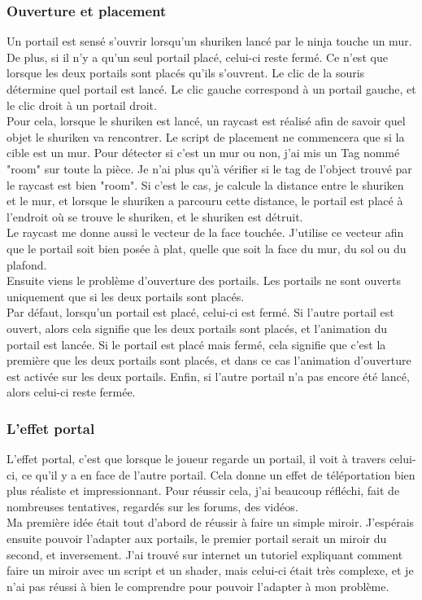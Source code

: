 \documentclass[12pt]{article}
\begin{document}
\subsubsection{Ouverture et placement}

Un portail est sensé s'ouvrir lorsqu'un shuriken lancé par le ninja touche un mur. De plus, si il n'y a qu'un seul portail placé, celui-ci reste fermé. Ce n'est que lorsque les deux portails sont placés qu'ils s'ouvrent. Le clic de la souris détermine quel portail est lancé. Le clic gauche correspond à un portail gauche, et le clic droit à un portail droit.\\

Pour cela, lorsque le shuriken est lancé, un raycast est réalisé afin de savoir quel objet le shuriken va rencontrer. Le script de placement ne commencera que si la cible est un mur. Pour détecter si c'est un mur ou non, j'ai mis un Tag nommé "room" sur toute la pièce. Je n'ai plus qu'à vérifier si le tag de l'object trouvé par le raycast est bien "room". Si c'est le cas, je calcule la distance entre le shuriken et le mur, et lorsque le shuriken a parcouru cette distance, le portail est placé à l'endroit où se trouve le shuriken, et le shuriken est détruit.\\
Le raycast me donne aussi le vecteur de la face touchée. J'utilise ce vecteur afin que le portail soit bien posée à plat, quelle que soit la face du mur, du sol ou du plafond.\\

Ensuite viens le problème d'ouverture des portails. Les portails ne sont ouverts uniquement que si les deux portails sont placés.\\
Par défaut, lorsqu'un portail est placé, celui-ci est fermé. Si l'autre portail est ouvert, alors cela signifie que les deux portails sont placés, et l'animation du portail est lancée. Si le portail est placé mais fermé, cela signifie que c'est la première que les deux portails sont placés, et dans ce cas l'animation d'ouverture est activée sur les deux portails. Enfin, si l'autre portail n'a pas encore été lancé, alors celui-ci reste fermée.

\subsubsection{L'effet portal}

L'effet portal, c'est que lorsque le joueur regarde un portail, il voit à travers celui-ci, ce qu'il y a en face de l'autre portail. Cela donne un effet de téléportation bien plus réaliste et impressionnant. Pour réussir cela, j'ai beaucoup réfléchi, fait de nombreuses tentatives, regardés sur les forums, des vidéos.\\
Ma première idée était tout d'abord de réussir à faire un simple miroir. J'espérais ensuite pouvoir l'adapter aux portails, le premier portail serait un miroir du second, et inversement. J'ai trouvé sur internet un tutoriel expliquant comment faire un miroir avec un script et un shader, mais celui-ci était très complexe, et je n'ai pas réussi à bien le comprendre pour pouvoir l'adapter à mon problème.\\
\end{document}
